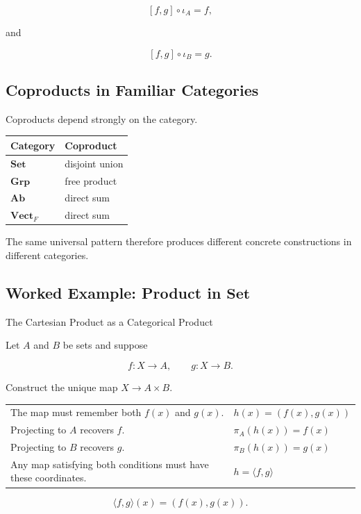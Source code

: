\[ [f,g]\circ\iota_A=f, \]

and

\[ [f,g]\circ\iota_B=g. \]
\subsection{Coproducts in Familiar Categories}
\label{subsec:coproducts-familiar}

Coproducts depend strongly on the category.

\begin{center}
\begin{tabularx}{0.9\textwidth}{@{}lX@{}}
\toprule
\textbf{Category} & \textbf{Coproduct}\\
\midrule
\(\mathbf{Set}\) & disjoint union\\
\(\mathbf{Grp}\) & free product\\
\(\mathbf{Ab}\) & direct sum\\
\(\mathbf{Vect}_F\) & direct sum\\
\bottomrule
\end{tabularx}
\end{center}

The same universal pattern therefore produces different concrete
constructions in different categories.

\subsection{Worked Example: Product in \(\mathbf{Set}\)}
\label{subsec:worked-category-product}

\begin{workedexamplebox}{The Cartesian Product as a Categorical Product}

Let \(A\) and \(B\) be sets and suppose

\[ f:X\to A,\qquad g:X\to B. \]

Construct the unique map \(X\to A\times B\).

\begin{tabularx}{\textwidth}{@{}>{\raggedright\arraybackslash}p{}X@{}}
The map must remember both \(f(x)\) and \(g(x)\). &
\(h(x)=(f(x),g(x))\)\\
Projecting to \(A\) recovers \(f\). &
\(\pi_A(h(x))=f(x)\)\\
Projecting to \(B\) recovers \(g\). &
\(\pi_B(h(x))=g(x)\)\\
Any map satisfying both conditions must have these coordinates. &
\(h=\langle f,g\rangle\)
\end{tabularx}

\begin{answerbox}
\[ \boxed{\langle f,g\rangle(x)=(f(x),g(x)).} \]
\end{answerbox}
\end{workedexamplebox}

